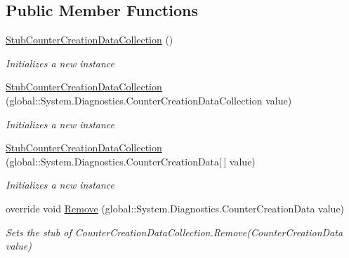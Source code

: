 \subsection*{Public Member Functions}
\begin{DoxyCompactItemize}
\item 
\hyperlink{class_system_1_1_diagnostics_1_1_fakes_1_1_stub_counter_creation_data_collection_a43882698c93d2157f0b14fbd7915d042}{Stub\-Counter\-Creation\-Data\-Collection} ()
\begin{DoxyCompactList}\small\item\em Initializes a new instance\end{DoxyCompactList}\item 
\hyperlink{class_system_1_1_diagnostics_1_1_fakes_1_1_stub_counter_creation_data_collection_a36517a0020b1eec57d478bb360ef5bd7}{Stub\-Counter\-Creation\-Data\-Collection} (global\-::\-System.\-Diagnostics.\-Counter\-Creation\-Data\-Collection value)
\begin{DoxyCompactList}\small\item\em Initializes a new instance\end{DoxyCompactList}\item 
\hyperlink{class_system_1_1_diagnostics_1_1_fakes_1_1_stub_counter_creation_data_collection_adb0ec68aa2f844e96a68fb0ff495be34}{Stub\-Counter\-Creation\-Data\-Collection} (global\-::\-System.\-Diagnostics.\-Counter\-Creation\-Data\mbox{[}$\,$\mbox{]} value)
\begin{DoxyCompactList}\small\item\em Initializes a new instance\end{DoxyCompactList}\item 
override void \hyperlink{class_system_1_1_diagnostics_1_1_fakes_1_1_stub_counter_creation_data_collection_aec802c4ddb837f5c458b7baf877991d1}{Remove} (global\-::\-System.\-Diagnostics.\-Counter\-Creation\-Data value)
\begin{DoxyCompactList}\small\item\em Sets the stub of Counter\-Creation\-Data\-Collection.\-Remove(\-Counter\-Creation\-Data value)\end{DoxyCompactList}\end{DoxyCompactItemize}
